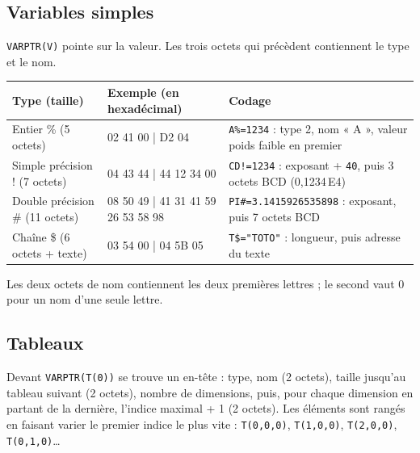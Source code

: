 \documentclass[a4paper,10pt]{article}
\newcommand{\hex}[1]{\texttt{#1}}
\begin{document}
\subsection{Variables simples}
\texttt{VARPTR(V)} pointe sur la valeur. Les trois octets qui précèdent
contiennent le type et le nom.

\begin{center}\small
\begin{tabular}{@{}>{\raggedright}p{2.6cm}>{\ttfamily\raggedright}p{4.2cm}>{\raggedright\arraybackslash}p{9cm}@{}}
\toprule
Type (taille) & \normalfont Exemple (en hexadécimal) & Codage \\
\midrule
Entier \% (5 octets) & 02 41 00 | D2 04 & \texttt{A\%=1234} : type 2, nom « A », valeur poids faible en premier \\
Simple précision ! (7 octets) & 04 43 44 | 44 12 34 00 & \texttt{CD!=1234} : exposant + \hex{40}, puis 3 octets BCD (0,1234\,E4) \\
Double précision \# (11 octets) & 08 50 49 | 41 31 41 59 26 53 58 98 & \texttt{PI\#=3.1415926535898} : exposant, puis 7 octets BCD \\
Chaîne \$ (6 octets + texte) & 03 54 00 | 04 5B 05 & \texttt{T\$="TOTO"} : longueur, puis adresse du texte \\
\bottomrule
\end{tabular}
\end{center}
Les deux octets de nom contiennent les deux premières lettres ; le second
vaut 0 pour un nom d'une seule lettre.

\subsection{Tableaux}
Devant \texttt{VARPTR(T(0))} se trouve un en-tête : type, nom (2 octets),
taille jusqu'au tableau suivant (2 octets), nombre de dimensions, puis, pour
chaque dimension en partant de la dernière, l'indice maximal + 1 (2 octets).
Les éléments sont rangés en faisant varier le premier indice le plus vite :
\texttt{T(0,0,0)}, \texttt{T(1,0,0)}, \texttt{T(2,0,0)},
\texttt{T(0,1,0)}\dots
\end{document}
